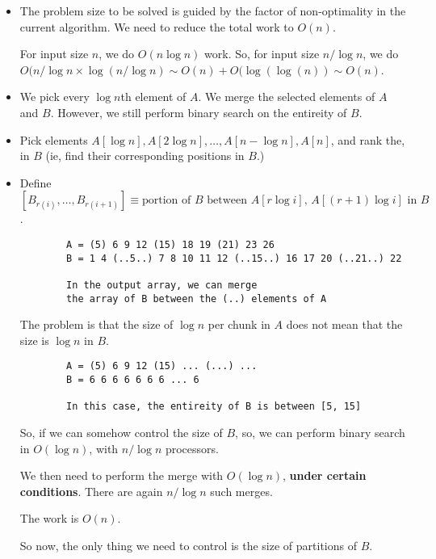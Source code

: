 \begin{itemize}
    \item The problem size to be solved is guided by the factor of non-optimality
        in the current algorithm. We need to reduce the total work to $O(n)$.

        For input size $n$, we do $O(n \log n)$ work. So, for input size $n / \log n$,
        we do $O(n / \log n \times \log (n / \log n) \sim O(n) + O(\log(\log(n)) \sim O(n)$.

    \item We pick every $\log n$th element of $A$. We merge the selected elements
        of $A$ and $B$. However, we still perform binary search on the entireity of $B$.

    \item Pick elements $A[\log n], A[2 \log n], \dots, A[ n - \log n], A[n]$, and
        rank the, in $B$ (ie, find their corresponding positions in $B$.)

    \item Define $[B_{r(i)}, \dots, B_{r(i + 1)}] \equiv \text{portion of $B$ between $A[r \log i]$, $A[(r + 1) \log i]$ in $B$}$.

        \begin{verbatim}
        A = (5) 6 9 12 (15) 18 19 (21) 23 26
        B = 1 4 (..5..) 7 8 10 11 12 (..15..) 16 17 20 (..21..) 22

        In the output array, we can merge
        the array of B between the (..) elements of A
        \end{verbatim}

        The problem is that the size of $\log n$ per chunk in $A$ does not mean
        that the size is $\log n$ in $B$.


        \begin{verbatim}
        A = (5) 6 9 12 (15) ... (...) ...
        B = 6 6 6 6 6 6 6 ... 6

        In this case, the entireity of B is between [5, 15]
        \end{verbatim}

        So, if we can somehow control the size of $B$, so, we can perform
        binary search in $O(\log n)$, with $n / \log n$ processors.

        We then need to perform the merge with $O(\log n)$, 
        \textbf{under certain conditions}.  There are again $n / \log n$
        such merges.


        The work is $O(n)$.


        So now, the only thing we need to control is the size of partitions
        of $B$.



\end{itemize}
